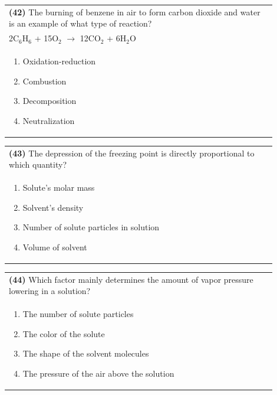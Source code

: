 \documentclass{article}
\begin{document}
\noindent\begin{tabular}{|p{0.9\linewidth}|}
\hline
\textbf{(42)} The burning of benzene in air to form carbon dioxide and water is an example of what type of reaction?\\[0.2cm]
2C$_6$H$_6$ + 15O$_2$ $\rightarrow$ 12CO$_2$ + 6H$_2$O\\[0.2cm]
\begin{minipage}[t]{0.85\linewidth}
\begin{enumerate}[label=\alph*.]
\item Oxidation-reduction
\item Combustion
\item Decomposition
\item Neutralization
\end{enumerate}
\end{minipage}\\[0.2cm]
\hline
\end{tabular}

\noindent\begin{tabular}{|p{0.9\linewidth}|}
\hline
\textbf{(43)} The depression of the freezing point is directly proportional to which quantity?\\[0.2cm]
\begin{minipage}[t]{0.85\linewidth}
\begin{enumerate}[label=\alph*.]
\item Solute's molar mass
\item Solvent's density
\item Number of solute particles in solution
\item Volume of solvent
\end{enumerate}
\end{minipage}\\[0.2cm]
\hline
\end{tabular}

\noindent\begin{tabular}{|p{0.9\linewidth}|}
\hline
\textbf{(44)} Which factor mainly determines the amount of vapor pressure lowering in a solution?\\[0.2cm]
\begin{minipage}[t]{0.85\linewidth}
\begin{enumerate}[label=\alph*.]
\item The number of solute particles
\item The color of the solute
\item The shape of the solvent molecules
\item The pressure of the air above the solution
\end{enumerate}
\end{minipage}\\[0.2cm]
\hline
\end{tabular}
\newpage
\end{document}
